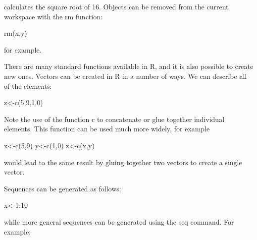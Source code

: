 \documentclass[
]{book}
\newenvironment{Shaded}{\begin{snugshade}}{\end{snugshade}}
\newcommand{\DecValTok}[1]{\textcolor[rgb]{0.00,0.00,0.81}{#1}}
\newcommand{\FunctionTok}[1]{\textcolor[rgb]{0.00,0.00,0.00}{#1}}
\newcommand{\NormalTok}[1]{#1}
\newcommand{\OtherTok}[1]{\textcolor[rgb]{0.56,0.35,0.01}{#1}}
\newcommand{\SpecialCharTok}[1]{\textcolor[rgb]{0.00,0.00,0.00}{#1}}
\begin{document}
calculates the square root of 16. Objects can be removed from the current workspace with the rm
function:

\begin{Shaded}
\begin{Highlighting}[]
\FunctionTok{rm}\NormalTok{(x,y)}
\end{Highlighting}
\end{Shaded}

for example.

There are many standard functions available in R, and it is also possible to create new ones.
Vectors can be created in R in a number of ways. We can describe all of the elements:

\begin{Shaded}
\begin{Highlighting}[]
\NormalTok{z}\OtherTok{\textless{}{-}}\FunctionTok{c}\NormalTok{(}\DecValTok{5}\NormalTok{,}\DecValTok{9}\NormalTok{,}\DecValTok{1}\NormalTok{,}\DecValTok{0}\NormalTok{)}
\end{Highlighting}
\end{Shaded}

Note the use of the function c to concatenate or glue together individual elements. This function
can be used much more widely, for example

\begin{Shaded}
\begin{Highlighting}[]
\NormalTok{x}\OtherTok{\textless{}{-}}\FunctionTok{c}\NormalTok{(}\DecValTok{5}\NormalTok{,}\DecValTok{9}\NormalTok{)}
\NormalTok{y}\OtherTok{\textless{}{-}}\FunctionTok{c}\NormalTok{(}\DecValTok{1}\NormalTok{,}\DecValTok{0}\NormalTok{)}
\NormalTok{z}\OtherTok{\textless{}{-}}\FunctionTok{c}\NormalTok{(x,y)}
\end{Highlighting}
\end{Shaded}

would lead to the same result by gluing together two vectors to create a single vector.

Sequences can be generated as follows:

\begin{Shaded}
\begin{Highlighting}[]
\NormalTok{x}\OtherTok{\textless{}{-}}\DecValTok{1}\SpecialCharTok{:}\DecValTok{10}
\end{Highlighting}
\end{Shaded}

while more general sequences can be generated using the seq command. For example:
\end{document}
